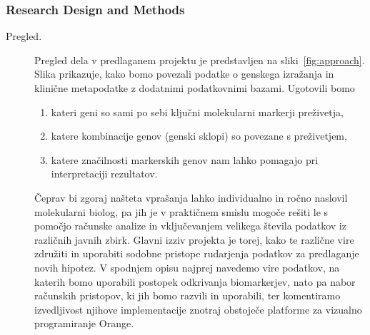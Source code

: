 \documentclass[11pt,a4paper]{article}
\begin{document}
\subsubsection{Research Design and Methods}
\begin{description}
	\item[Pregled.] Pregled dela v predlaganem projektu je predstavljen na sliki~\ref{fig:approach}. Slika prikazuje, kako bomo povezali podatke o genskega izražanja in klinične metapodatke z dodatnimi podatkovnimi bazami. Ugotovili bomo
\begin{enumerate}
\item kateri geni so sami po sebi ključni molekularni markerji preživetja,
\item katere kombinacije genov (genski sklopi) so povezane s preživetjem,
\item katere značilnosti markerskih genov nam lahko pomagajo pri interpretaciji rezultatov.
\end{enumerate}
Čeprav bi zgoraj našteta vprašanja lahko individualno in ročno naslovil molekularni biolog, pa jih je v praktičnem smislu mogoče rešiti le s pomočjo računske analize in vključevanjem velikega števila podatkov iz različnih javnih zbirk. Glavni izziv projekta je torej, kako te različne vire združiti in uporabiti sodobne pristope rudarjenja podatkov za predlaganje novih hipotez. V spodnjem opisu najprej navedemo vire podatkov, na katerih bomo uporabili postopek odkrivanja biomarkerjev, nato pa nabor računskih pristopov, ki jih bomo razvili in uporabili, ter komentiramo izvedljivost njihove implementacije znotraj obstoječe platforme za vizualno programiranje Orange.


\end{description}
\end{document}
